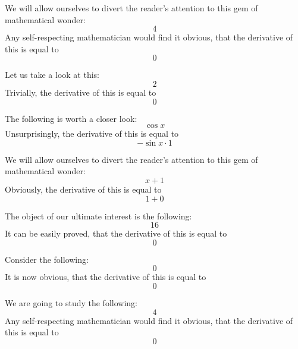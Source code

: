 \documentclass{article}
\begin{document}
We will allow ourselves to divert the reader's attention to this gem of mathematical wonder:
\begin{equation}
4 
\end{equation}
Any self-respecting mathematician would find it obvious, that the derivative of this is equal to
\begin{equation}
0 
\end{equation}

Let us take a look at this:
\begin{equation}
2 
\end{equation}
Trivially, the derivative of this is equal to
\begin{equation}
0 
\end{equation}

The following is worth a closer look:
\begin{equation}
\cos x 
\end{equation}
Unsurprisingly, the derivative of this is equal to
\begin{equation}
-\sin x \cdot 1 
\end{equation}

We will allow ourselves to divert the reader's attention to this gem of mathematical wonder:
\begin{equation}
x + 1 
\end{equation}
Obviously, the derivative of this is equal to
\begin{equation}
1 + 0 
\end{equation}

The object of our ultimate interest is the following:
\begin{equation}
16 
\end{equation}
It can be easily proved, that the derivative of this is equal to
\begin{equation}
0 
\end{equation}

Consider the following:
\begin{equation}
0 
\end{equation}
It is now obvious, that the derivative of this is equal to
\begin{equation}
0 
\end{equation}

We are going to study the following:
\begin{equation}
4 
\end{equation}
Any self-respecting mathematician would find it obvious, that the derivative of this is equal to
\begin{equation}
0 
\end{equation}
\end{document}
